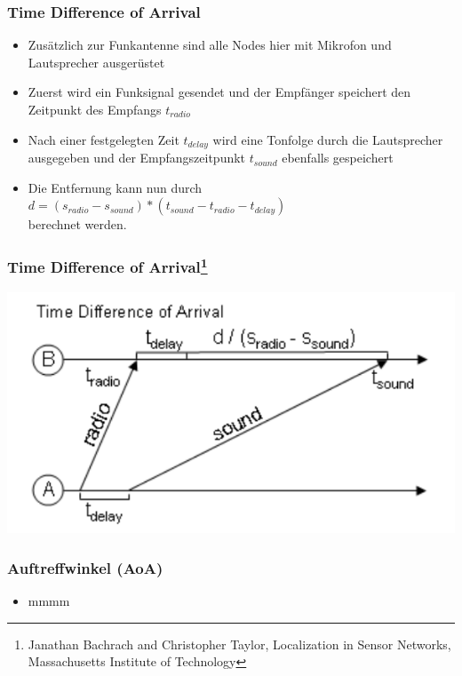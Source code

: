 \begin{frame}
\frametitle{Time Difference of Arrival}
\begin{itemize}
  \item Zusätzlich zur Funkantenne sind alle Nodes hier mit Mikrofon und Lautsprecher ausgerüstet
  \item Zuerst wird ein Funksignal gesendet und der Empfänger speichert den Zeitpunkt des Empfangs $t_{radio}$
  \item Nach einer festgelegten Zeit $t_{delay}$ wird eine Tonfolge durch die Lautsprecher ausgegeben und der Empfangszeitpunkt $t_{sound}$ ebenfalls gespeichert
  \item Die Entfernung kann nun durch $d = (s_{radio} - s_{sound}) * (t_{sound} - t_{radio} - t_{delay})$ \\berechnet werden.
\end{itemize}
\end{frame}

\begin{frame}
\frametitle{Time Difference of Arrival\footnote{Janathan Bachrach and Christopher Taylor, Localization in Sensor Networks, Massachusetts Institute of Technology}}
  \begin{center}
    \includegraphics[scale=0.5]{img/tdoa1.png}
  \end{center}
\end{frame}

\begin{frame}
\frametitle{Auftreffwinkel (AoA)}

\begin{itemize}
  \item mmmm
\end{itemize}
\end{frame}
